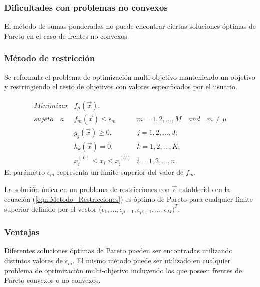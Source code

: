 \subsubsection*{Dificultades con problemas no convexos}
El método de sumas ponderadas no puede encontrar ciertas soluciones óptimas de Pareto en el caso de frentes no convexos.

\subsubsection{Método de restricción}
Se reformula el problema de optimización multi-objetivo manteniendo un objetivo y restringiendo el resto de objetivos  con valores especificados por el usuario.

\begin{equation} \label{eqn:Metodo_Restricciones}
\begin{matrix}
Minimizar         & f_{\mu}(\vec{x}), &  \\
sujeto \quad a & f_m(\vec{x}) \leq \epsilon_m					& m=1, 2, ..., M \quad and \quad m \neq \mu\\
				 & g_j(\vec{x}) \geq 0,                          & j=1, 2, ..., J;\\
                 & h_k(\vec{x}) = 0,                             & k=1,2, ..., K; \\
                 & x_i^{(L)} \leq x_i \leq x_i^{(U)}                & i=1, 2, ..., n.
\end{matrix}
\end{equation}
El parámetro $\epsilon_m$ representa un límite superior del valor de $f_m$.
\begin{Classic}
La solución única en un problema de restricciones con $\vec{\epsilon}$ establecido en la ecuación (\ref{eqn:Metodo_Restricciones}) es óptimo de Pareto para cualquier límite superior definido por el vector ($\epsilon_1, ..., \epsilon_{\mu-1}, \epsilon_{\mu+1}, ..., \epsilon_{M})^T$.
\end{Classic}
\subsubsection*{Ventajas}
Diferentes soluciones óptimas de Pareto pueden ser encontradas utilizando distintos valores de $\epsilon_m$. El mismo método puede ser utilizado en cualquier problema de optimización multi-objetivo incluyendo los que poseen frentes de Pareto convexos o no convexos.
